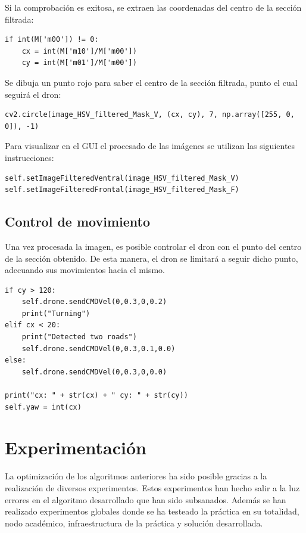 Si la comprobación es exitosa, se extraen las coordenadas del centro de la sección filtrada:

\lstset{language=Python, breaklines=true, basicstyle=\footnotesize}
\begin{lstlisting}[frame=single]
if int(M['m00']) != 0:
    cx = int(M['m10']/M['m00'])
    cy = int(M['m01']/M['m00'])
\end{lstlisting}

Se dibuja un punto rojo para saber el centro de la sección filtrada, punto el cual seguirá el dron:

\lstset{language=Python, breaklines=true, basicstyle=\footnotesize}
\begin{lstlisting}[frame=single]
cv2.circle(image_HSV_filtered_Mask_V, (cx, cy), 7, np.array([255, 0, 0]), -1)
\end{lstlisting}

Para visualizar en el GUI el procesado de las imágenes se utilizan las siguientes instrucciones:

\lstset{language=Python, breaklines=true, basicstyle=\footnotesize}
\begin{lstlisting}[frame=single]
self.setImageFilteredVentral(image_HSV_filtered_Mask_V)
self.setImageFilteredFrontal(image_HSV_filtered_Mask_F)
\end{lstlisting}

\subsection{Control de movimiento}
Una vez procesada la imagen, es posible controlar el dron con el punto del centro de la sección obtenido. De esta manera, el dron se limitará a seguir dicho punto, adecuando sus movimientos hacia el mismo.

\lstset{language=Python, breaklines=true, basicstyle=\footnotesize}
\begin{lstlisting}[frame=single]
if cy > 120:
    self.drone.sendCMDVel(0,0.3,0,0.2)
    print("Turning")
elif cx < 20:
    print("Detected two roads")
    self.drone.sendCMDVel(0,0.3,0.1,0.0)
else:
    self.drone.sendCMDVel(0,0.3,0,0.0)

print("cx: " + str(cx) + " cy: " + str(cy))
self.yaw = int(cx)
\end{lstlisting}

\section{Experimentación}
La optimización de los algoritmos anteriores ha sido posible gracias a la realización de
diversos experimentos. Estos experimentos han hecho salir a la luz errores en el algoritmo
desarrollado que han sido subsanados.
Además se han realizado experimentos globales donde se ha testeado la práctica en su
totalidad, nodo académico, infraestructura de la práctica y solución desarrollada.

